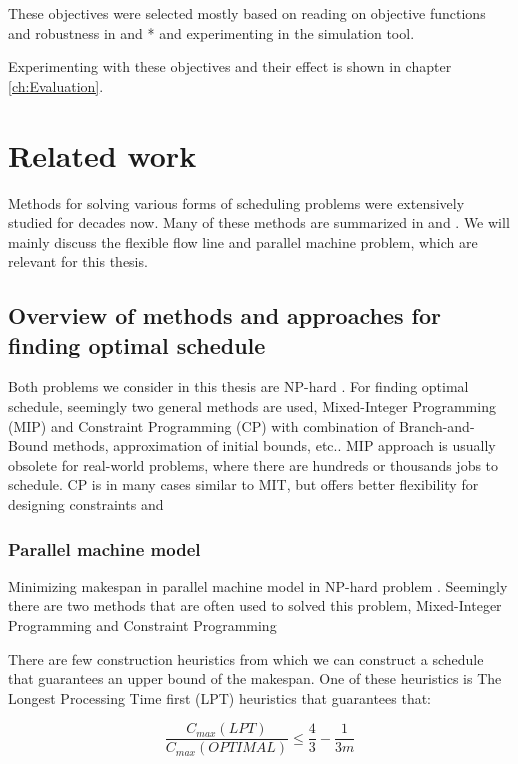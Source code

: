 \documentclass{ctuthesis}
\begin{document}
 These objectives were selected mostly based on reading on objective functions and robustness in \cite{pinedo} and \cite{tkindt}* and experimenting in the simulation tool. 
 
 Experimenting with these objectives and their effect is shown in chapter \ref{ch:Evaluation}.

\chapter{Related work}

Methods for solving various forms of scheduling problems were extensively studied for decades now. Many of these methods are summarized in \cite{pinedo} and \cite{bucker}. We will mainly discuss the flexible flow line and parallel machine problem, which are relevant for this thesis. 

\section{Overview of methods and approaches for finding optimal schedule}

Both problems we consider in this thesis are NP-hard \cite{complexity}. For finding optimal schedule, seemingly two general methods are used, Mixed-Integer Programming (MIP) and Constraint Programming (CP) with combination of Branch-and-Bound methods, approximation of initial bounds, etc.. MIP approach is usually obsolete for real-world problems, where there are hundreds or thousands jobs to schedule. CP is in many cases similar to MIT, but offers better flexibility for designing constraints and 

\subsection{Parallel machine model}

Minimizing makespan in parallel machine model in NP-hard problem \cite{complexity}. Seemingly there are two methods that are often used to solved this problem, Mixed-Integer Programming and Constraint Programming 




There are few construction heuristics from which we can construct a schedule that guarantees an upper bound of the makespan. One of these heuristics is The Longest Processing Time first (LPT) heuristics that guarantees that:

\begin{equation}
\dfrac{C_{max}(LPT)}{C_{max}(OPTIMAL)} \leq \dfrac{4}{3} - \dfrac{1}{3m}
\end{equation}
\end{document}
